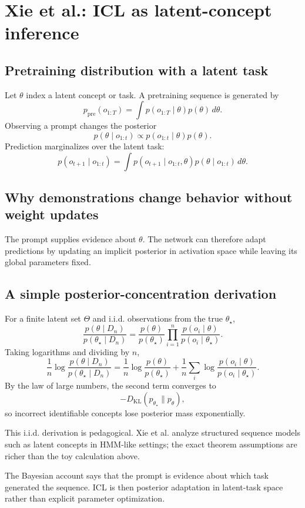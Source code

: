 \documentclass[11pt,a4paper,oneside,openany]{memoir}
\theoremstyle{definition}
\begin{document}
\chapter{Xie et al.: ICL as latent-concept inference}
\section{Pretraining distribution with a latent task}
Let $\theta$ index a latent concept or task.  A pretraining sequence is generated by
\[
p_{\mathrm{pre}}(o_{1:T})
=\int p(o_{1:T}\mid\theta)p(\theta)\,d\theta.
\]
Observing a prompt changes the posterior
\[
p(\theta\mid o_{1:t})
\propto p(o_{1:t}\mid\theta)p(\theta).
\]
Prediction marginalizes over the latent task:
\[
p(o_{t+1}\mid o_{1:t})
=\int p(o_{t+1}\mid o_{1:t},\theta)
 p(\theta\mid o_{1:t})\,d\theta.
\]

\section{Why demonstrations change behavior without weight updates}
The prompt supplies evidence about $\theta$.  The network can therefore adapt predictions by updating an implicit posterior in activation space while leaving its global parameters fixed.

\section{A simple posterior-concentration derivation}
For a finite latent set $\Theta$ and i.i.d. observations from the true $\theta_\star$,
\[
\frac{p(\theta\mid D_n)}{p(\theta_\star\mid D_n)}
=\frac{p(\theta)}{p(\theta_\star)}
\prod_{i=1}^n
\frac{p(o_i\mid\theta)}{p(o_i\mid\theta_\star)}.
\]
Taking logarithms and dividing by $n$,
\[
\frac1n\log\frac{p(\theta\mid D_n)}{p(\theta_\star\mid D_n)}
=\frac1n\log\frac{p(\theta)}{p(\theta_\star)}
+\frac1n\sum_i\log\frac{p(o_i\mid\theta)}{p(o_i\mid\theta_\star)}.
\]
By the law of large numbers, the second term converges to
\[
-D_{\mathrm{KL}}(p_{\theta_\star}\|p_\theta),
\]
so incorrect identifiable concepts lose posterior mass exponentially.

\begin{warningbox}
This i.i.d. derivation is pedagogical.  Xie et al. analyze structured sequence models such as latent concepts in HMM-like settings; the exact theorem assumptions are richer than the toy calculation above.
\end{warningbox}

\begin{presentbox}
The Bayesian account says that the prompt is evidence about which task generated the sequence.  ICL is then posterior adaptation in latent-task space rather than explicit parameter optimization.
\end{presentbox}
\end{document}
